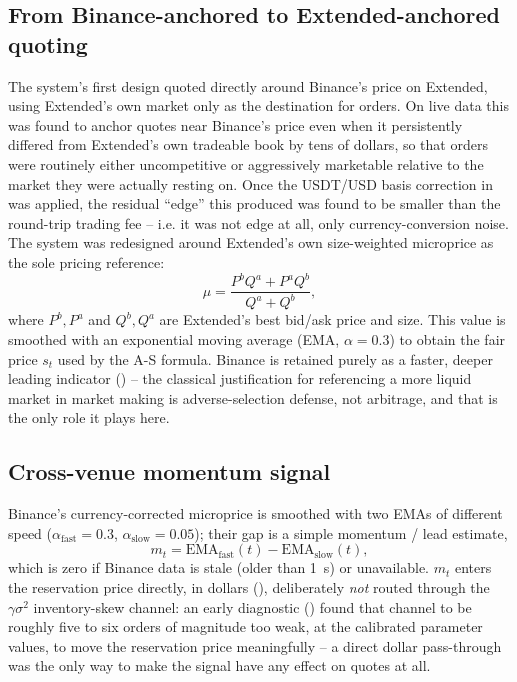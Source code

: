 \documentclass[11pt,a4paper]{article}
\begin{document}
\subsection{From Binance-anchored to Extended-anchored quoting}
\label{sec:pivot}

The system's first design quoted directly around Binance's price on Extended, using Extended's
own market only as the destination for orders. On live data this was found to anchor quotes near
Binance's price even when it persistently differed from Extended's own tradeable book by tens of
dollars, so that orders were routinely either uncompetitive or aggressively marketable relative
to the market they were actually resting on. Once the USDT/USD basis correction in
 was applied, the residual ``edge'' this produced was found to be smaller than the
round-trip trading fee -- i.e. it was not edge at all, only currency-conversion noise. The system
was redesigned around Extended's own size-weighted microprice as the sole pricing reference:
\begin{equation}
  \mu = \frac{P^{b}Q^{a} + P^{a}Q^{b}}{Q^{a}+Q^{b}},
  \label{eq:microprice}
\end{equation}
where $P^{b},P^{a}$ and $Q^{b},Q^{a}$ are Extended's best bid/ask price and size. This value is
smoothed with an exponential moving average (EMA, $\alpha=0.3$) to obtain the fair price
$s_t$ used by the A-S formula. Binance is retained purely as a faster, deeper leading indicator
() -- the classical justification for referencing a more liquid market in
market making is adverse-selection defense, not arbitrage, and that is the only role it plays
here.

\subsection{Cross-venue momentum signal}
\label{sec:momentum}

Binance's currency-corrected microprice is smoothed with two EMAs of different speed
($\alpha_{\text{fast}}=0.3$, $\alpha_{\text{slow}}=0.05$); their gap is a simple momentum / lead
estimate,
\begin{equation}
  m_t = \text{EMA}_{\text{fast}}(t) - \text{EMA}_{\text{slow}}(t),
\end{equation}
which is zero if Binance data is stale (older than \SI{1}{\second}) or unavailable. $m_t$ enters
the reservation price directly, in dollars (), deliberately \emph{not}
routed through the $\gamma\sigma^{2}$ inventory-skew channel: an early diagnostic
() found that channel to be roughly five to six orders of magnitude too
weak, at the calibrated parameter values, to move the reservation price meaningfully -- a direct
dollar pass-through was the only way to make the signal have any effect on quotes at all.
\end{document}

